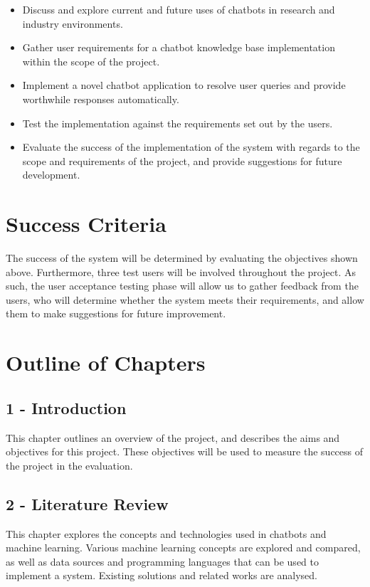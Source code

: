 \begin{itemize}
	\itemsep0em 
	\item Discuss and explore current and future uses of chatbots in research and industry environments.
	\item Gather user requirements for a chatbot knowledge base implementation within the scope of the project.
	\item Implement a novel chatbot application to resolve user queries and provide worthwhile responses automatically.
	\item Test the implementation against the requirements set out by the users.
	\item Evaluate the success of the implementation of the system with regards to the scope and requirements of the project, and provide suggestions for future development.
\end{itemize}

\section{Success Criteria}
The success of the system will be determined by evaluating the objectives shown above. Furthermore, three test users will be involved throughout the project. As such, the user acceptance testing phase will allow us to gather feedback from the users, who will determine whether the system meets their requirements, and allow them to make suggestions for future improvement.

\newpage
\section{Outline of Chapters}

\subsection*{1 - Introduction}
This chapter outlines an overview of the project, and describes the aims and objectives for this project. These objectives will be used to measure the success of the project in the evaluation.

\subsection*{2 - Literature Review}
This chapter explores the concepts and technologies used in chatbots and machine learning. Various machine learning concepts are explored and compared, as well as data sources and programming languages that can be used to implement a system. Existing solutions and related works are analysed.

